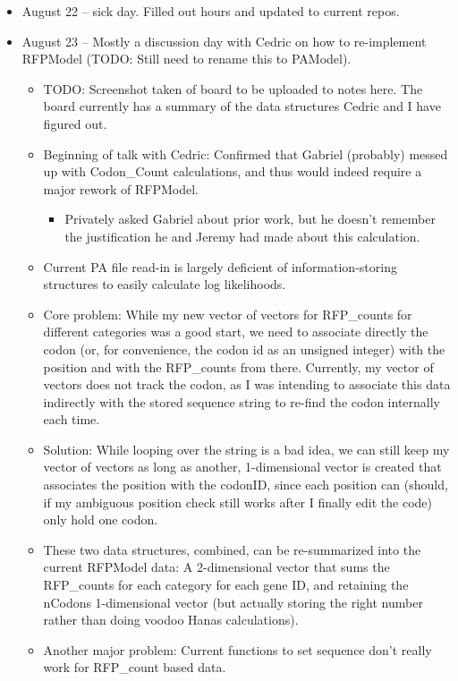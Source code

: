 \documentclass[12pt,hyperref]{labbook}
\begin{document}
\begin{itemize}
    \item August 22 -- sick day.
    Filled out hours and updated to current repos.
    \item August 23 -- Mostly a discussion day with Cedric on how to re-implement RFPModel (TODO: Still need to rename this to PAModel).
    \begin{itemize}
        \item TODO: Screenshot taken of board to be uploaded to notes here.
        The board currently has a summary of the data structures Cedric and I have figured out.
        \item Beginning of talk with Cedric: Confirmed that Gabriel (probably) messed up with Codon\_Count calculations, and thus would indeed require a major rework of RFPModel.
        \begin{itemize}
            \item Privately asked Gabriel about prior work, but he doesn't remember the justification he and Jeremy had made about this calculation.
        \end{itemize}
        \item Current PA file read-in is largely deficient of information-storing structures to easily calculate log likelihoods.
        \item Core problem: While my new vector of vectors for RFP\_counts for different categories was a good start, we need to associate directly the codon (or, for convenience, the codon id as an unsigned integer) with the position and with the RFP\_counts from there.
        Currently, my vector of vectors does not track the codon, as I was intending to associate this data indirectly with the stored sequence string to re-find the codon internally each time.
        \item Solution: While looping over the string is a bad idea, we can still keep my vector of vectors as long as another, 1-dimensional vector is created that associates the position with the codonID, since each position can (should, if my ambiguous position check still works after I finally edit the code) only hold one codon.
        \item These two data structures, combined, can be re-summarized into the current RFPModel data: A 2-dimensional vector that sums the RFP\_counts for each category for each gene ID, and retaining the nCodons 1-dimensional vector (but actually storing the right number rather than doing voodoo Hanas calculations).
        \item Another major problem: Current functions to set sequence don't really work for RFP\_count based data.

\end{itemize}
\end{itemize}
\end{document}
